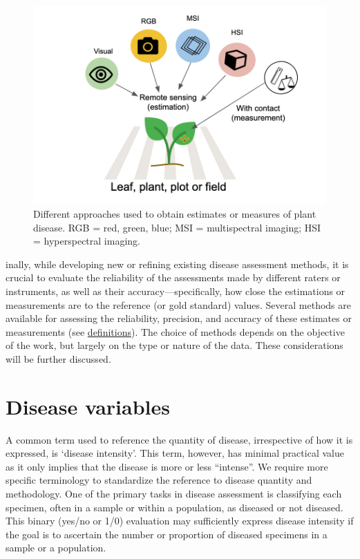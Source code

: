 \documentclass[
  letterpaper,
]{book}
\begin{document}
\begin{figure}

{\centering \includegraphics[width=5.10417in,height=\textheight]{imgs/disease_measure.png}

}

\caption{\label{fig-disease_measure}Different approaches used to obtain
estimates or measures of plant disease. RGB = red, green, blue; MSI =
multispectral imaging; HSI = hyperspectral imaging.}

\end{figure}

inally, while developing new or refining existing disease assessment
methods, it is crucial to evaluate the reliability of the assessments
made by different raters or instruments, as well as their
accuracy---specifically, how close the estimations or measurements are
to the reference (or gold standard) values. Several methods are
available for assessing the reliability, precision, and accuracy of
these estimates or measurements (see
\href{data-accuracy.html}{definitions}). The choice of methods depends
on the objective of the work, but largely on the type or nature of the
data. These considerations will be further discussed.

\hypertarget{disease-variables-1}{%
\section{Disease variables}\label{disease-variables-1}}

A common term used to reference the quantity of disease, irrespective of
how it is expressed, is `disease intensity'. This term, however, has
minimal practical value as it only implies that the disease is more or
less ``intense''. We require more specific terminology to standardize
the reference to disease quantity and methodology. One of the primary
tasks in disease assessment is classifying each specimen, often in a
sample or within a population, as diseased or not diseased. This binary
(yes/no or 1/0) evaluation may sufficiently express disease intensity if
the goal is to ascertain the number or proportion of diseased specimens
in a sample or a population.
\end{document}
